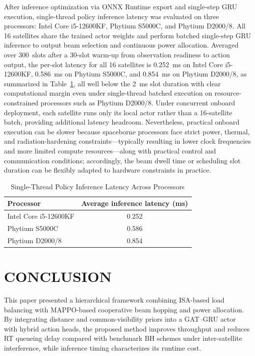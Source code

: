 \documentclass[journal]{IEEEtran}
\newcommand{\revbegin}[1]{\color{revisionblue}\ignorespaces}
\newcommand{\revend}[1]{\color{black}\ignorespaces}
\begin{document}
\revbegin{}After inference optimization via ONNX Runtime export and single-step GRU execution, single-thread policy inference latency was evaluated on three processors: Intel Core i5-12600KF, Phytium S5000C, and Phytium D2000/8. All 16 satellites share the trained actor weights and perform batched single-step GRU inference to output beam selection and continuous power allocation. Averaged over 300~slots after a 30-slot warm-up from observation readiness to action output, the per-slot latency for all 16 satellites is 0.252~ms on Intel Core i5-12600KF, 0.586~ms on Phytium S5000C, and 0.854~ms on Phytium D2000/8, as summarized in Table~\ref{tab:inference-latency}, all well below the 2~ms slot duration with clear computational margin even under single-thread batched execution on resource-constrained processors such as Phytium D2000/8. Under concurrent onboard deployment, each satellite runs only its local actor rather than a 16-satellite batch, providing additional latency headroom. Nevertheless, practical onboard execution can be slower because spaceborne processors face strict power, thermal, and radiation-hardening constraints---typically resulting in lower clock frequencies and more limited compute resources---along with practical control and communication conditions; accordingly, the beam dwell time or scheduling slot duration can be flexibly adapted to hardware constraints in practice.\revend{}

\begin{table}[t]
\revbegin{}
\centering
\caption{Single-Thread Policy Inference Latency Across Processors}
\label{tab:inference-latency}
\renewcommand{\arraystretch}{1.12}
\setlength{\tabcolsep}{8pt}
\footnotesize
\begin{tabular}{lc}
\hline
Processor & Average inference latency (ms) \\
\hline
Intel Core i5-12600KF & 0.252 \\
Phytium S5000C & 0.586 \\
Phytium D2000/8 & 0.854 \\
\hline
\end{tabular}
\revend{}
\end{table}

\section{CONCLUSION}
\label{sec:conclusion}
\revbegin{}This paper presented a hierarchical framework combining ISA-based load balancing with MAPPO-based cooperative beam hopping and power allocation. By integrating distance and common-visibility priors into a GAT--GRU actor with hybrid action heads, the proposed method improves throughput and reduces RT queueing delay compared with benchmark BH schemes under inter-satellite interference, while inference timing characterizes its runtime cost.\revend{}
\end{document}

